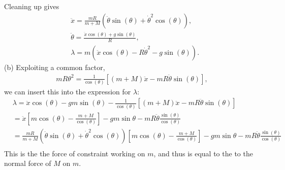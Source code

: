 \documentclass{article}
\begin{document}
        Cleaning up gives
        \begin{align*}
            &\ddot x = \frac{mR}{m + M} \left(\ddot \theta \sin(\theta) + \dot \theta^ 2 \cos(\theta)\right),\\
            & \ddot \theta =\frac{\ddot x \cos(\theta) + g \sin(\theta)}{R}, \\
            & \lambda = m\left(\ddot x \cos(\theta)- R \dot \theta^2 - g \sin(\theta)\right).
        \end{align*}
        (b) Exploiting a common factor, 
        \begin{align*}
            m R \theta^2 = \frac{1}{\cos(\theta)}\left[(m + M) \ddot x - m R \ddot \theta \sin(\theta) \right],
        \end{align*}
        we can insert this into the expression for $\lambda$:
        \begin{align*}
            & \lambda = \ddot x \cos(\theta) - g m \sin(\theta)
            - \frac{1}{\cos(\theta)}\left[(m + M) \ddot x - m R \ddot \theta \sin(\theta) \right] \\
            & = \ddot x \left[ m \cos(\theta) - \frac{m + M}{\cos(\theta)} \right] - g m \sin\theta - m R \ddot \theta \frac{\sin(\theta)}{\cos(\theta)} \\
            & = \frac{mR}{m + M} \left(\ddot \theta \sin(\theta) + \dot \theta^ 2 \cos(\theta)\right)\left[ m \cos(\theta) - \frac{m + M}{\cos(\theta)} \right] - g m \sin\theta - m R \ddot \theta \frac{\sin(\theta)}{\cos(\theta)} \\
        \end{align*}
        This is the the force of constraint working on $m$, and thus is equal to the to the normal force of $M$ on $m$.
\end{document}
